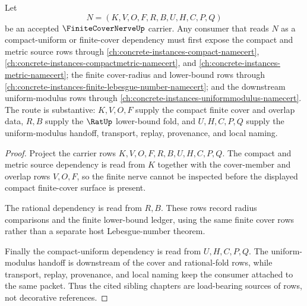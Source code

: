\begin{theorem}
\label{thm:finite-cover-nerve-orphan-sibling-route}
Let
$$
N=(K,V,O,F,R,B,U,H,C,P,Q)
$$
be an accepted $\FiniteCoverNerveUp$ carrier. Any consumer that reads $N$ as a compact-uniform or finite-cover dependency must first expose the compact and metric source rows through \autoref{ch:concrete-instances-compact-namecert}, \autoref{ch:concrete-instances-compactmetric-namecert}, and \autoref{ch:concrete-instances-metric-namecert}; the finite cover-radius and lower-bound rows through \autoref{ch:concrete-instances-finite-lebesgue-number-namecert}; and the downstream uniform-modulus rows through \autoref{ch:concrete-instances-uniformmodulus-namecert}. The route is substantive: $K,V,O,F$ supply the compact finite cover and overlap data, $R,B$ supply the $\RatUp$ lower-bound fold, and $U,H,C,P,Q$ supply the uniform-modulus handoff, transport, replay, provenance, and local naming.
\end{theorem}
\begin{proof}
Project the carrier rows $K,V,O,F,R,B,U,H,C,P,Q$. The compact and metric source dependency is read from $K$ together with the cover-member and overlap rows $V,O,F$, so the finite nerve cannot be inspected before the displayed compact finite-cover surface is present.

The rational dependency is read from $R,B$. These rows record radius comparisons and the finite lower-bound ledger, using the same finite cover rows rather than a separate host Lebesgue-number theorem.

Finally the compact-uniform dependency is read from $U,H,C,P,Q$. The uniform-modulus handoff is downstream of the cover and rational-fold rows, while transport, replay, provenance, and local naming keep the consumer attached to the same packet. Thus the cited sibling chapters are load-bearing sources of rows, not decorative references.
\end{proof}


